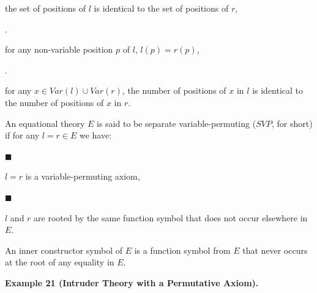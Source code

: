 \documentclass[10pt,a4paper]{amsart}
\begin{document}
the set of positions of $l$ is identical to the set of positions of $r$,\par
 
 
 
\par{}. 
 
for any non-variable position $p$ of $l$, $l(p)=r(p)$,\par
 
 
 
\par{}. 
 
for any $x\in\mathit{Var}(l)\cup\mathit{Var}(r)$, the number of positions of $x$ in $l$ is identical to the number of positions of $x$ in $r$.\par
 
 
  
An equational theory $E$ is said to be separate variable-permuting ($\mathit{SVP}$, for short) if for any $l=r\in E$ we have:\par
  
\par\noindent  $\blacksquare$ 
 
$l=r$ is a variable-permuting axiom,\par
 
 
 
\par\noindent  $\blacksquare$ 
 
$l$ and $r$ are rooted by the same function symbol that does not occur elsewhere in $E$.\par
 
 
  
An inner constructor symbol of $E$ is a function symbol from $E$ that never occurs at the root of any equality in $E$.\par
 
 
 
 
\par\medskip\noindent\textbf{Example 21 (Intruder Theory with a Permutative Axiom).}\par
 
 
\end{document}
